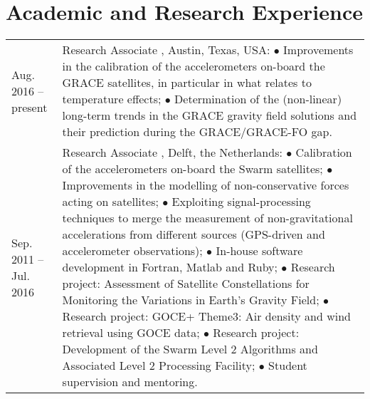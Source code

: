 \documentclass[a4paper]{article}
\newcommand{\dynhref}[2]{%
  \iftoggle{expliciturl}{%
    #2 (\href{#1}{\texttt{\detokenize{#1}}})%
  }{%
    \href{#1}{#2}%
  }%
}
\newlength{\listskipbig}
\newenvironment{cvsection}[2]{
  \setlength{\floatsep}{0pt}
  \setlength{\textfloatsep}{0pt}
  \setlength{\intextsep}{0pt}
  \section*{#1}
  \begin{longtable}{lp{#2}}
}{
  \end{longtable}
}
\begin{document}

\begin{cvsection}{Academic and Research Experience}{10.8cm}

Aug. 2016 -- present
  & Research Associate\newline
    \dynhref{http://www.csr.utexas.edu}{Center for Space Research}, \dynhref{http://www.utexas.edu}{Texas University at Austin}\newline
    Austin, Texas, USA:\newline
    $\bullet$ Improvements in the calibration of the accelerometers on-board the GRACE satellites, in particular in what relates to temperature effects;\newline
    $\bullet$ Determination of the (non-linear) long-term trends in the GRACE gravity field solutions and their prediction during the GRACE/GRACE-FO gap.
    \\[\listskipbig]

Sep. 2011 -- Jul. 2016
  & Research Associate\newline
    \dynhref{http://www.as.lr.tudelft.nl}{Astrodynamics and Space Missions}, \dynhref{http://www.tudelft.nl/}{Delft University of Technology}\newline
    Delft, the Netherlands:\newline
    $\bullet$ Calibration of the accelerometers on-board the Swarm satellites;\newline
    $\bullet$ Improvements in the modelling of non-conservative forces acting on satellites;\newline
    $\bullet$ Exploiting signal-processing techniques to merge the measurement of non-gravitational accelerations from different sources (GPS-driven and accelerometer observations);\newline
    $\bullet$ In-house software development in Fortran, Matlab and Ruby;\newline
    $\bullet$ Research project: Assessment of Satellite Constellations for Monitoring the Variations in Earth's Gravity Field;\newline
    $\bullet$ Research project: GOCE+ Theme3: Air density and wind retrieval using GOCE data;\newline
    $\bullet$ Research project: Development of the Swarm Level 2 Algorithms and Associated Level 2 Processing Facility;\newline
    $\bullet$ Student supervision and mentoring.
    \\[\listskipbig]


\end{cvsection}
\end{document}

